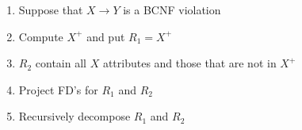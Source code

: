 \documentclass[12pt]{article}
\begin{document}
\begin{enumerate}[1.]
\begin{enumerate}[a)]
\begin{itemize}
            \begin{enumerate}[1.]
                \item Suppose that $X \to Y$ is a BCNF violation

                \item Compute $X^+$ and put $R_1 = X^+$

                \item $R_2$ contain all $X$ attributes and those that are not in $X^+$

                \item Project FD's for $R_1$ and $R_2$

                \item Recursively decompose $R_1$ and $R_2$

            \end{enumerate}

        \end{itemize}


    \end{enumerate}

\end{enumerate}
\end{document}

